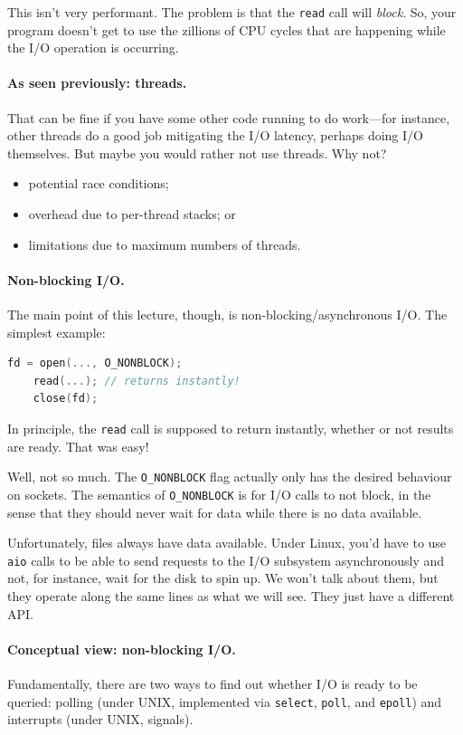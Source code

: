 \documentclass[a4paper]{report}
\begin{document}
This isn't very performant. The problem is that the {\tt read} call will
{\em block}. So, your program doesn't get to use the zillions of CPU cycles that
are happening while the I/O operation is occurring.

\paragraph{As seen previously: threads.} That can be fine if
you have some other code running to do work---for instance, other threads
do a good job mitigating the I/O latency, perhaps doing I/O themselves.
But maybe you would rather not use threads. Why not?

\begin{itemize}
\item potential race conditions;
\item overhead due to per-thread stacks; or
\item limitations due to maximum numbers of threads.
\end{itemize}

\paragraph{Non-blocking I/O.} The main point of this lecture, though,
is non-blocking/asynchronous I/O. The simplest example:

\begin{lstlisting}[language=C]
    fd = open(..., O_NONBLOCK);
    read(...); // returns instantly!
    close(fd);
\end{lstlisting}

In principle, the {\tt read} call is supposed to return instantly,
whether or not results are ready. That was easy!

Well, not so much. The {\tt O\_NONBLOCK} flag actually only has the
desired behaviour on sockets. The semantics of {\tt O\_NONBLOCK} is
for I/O calls to not block, in the sense that they should never wait
for data while there is no data available.

Unfortunately, files always have data available. Under Linux, you'd have
to use {\tt aio} calls to be able to send requests to the I/O subsystem
asynchronously and not, for instance, wait for the disk to spin up.
We won't talk about them, but they operate along the same lines as what
we will see. They just have a different API.

\paragraph{Conceptual view: non-blocking I/O.} Fundamentally,
there are two ways to find out whether I/O is ready to be queried:
polling (under UNIX, implemented via {\tt select}, {\tt poll},
and {\tt epoll}) and interrupts (under UNIX, signals).
\end{document}
